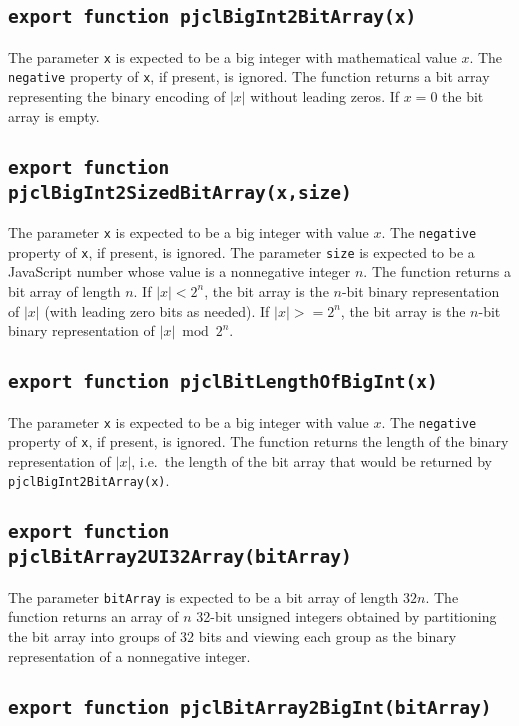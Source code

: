 \documentclass[12pt]{article}
\begin{document}
\subsection{\tt export function pjclBigInt2BitArray(x)}

The parameter {\tt x} is expected to be a big integer with mathematical value $x$.
The {\tt negative} property of {\tt x}, if present, is ignored.
The function returns a bit array representing the binary encoding of
$|x|$ without leading zeros.
If $x = 0$ the bit array is empty.

\subsection{\tt export function pjclBigInt2SizedBitArray(x,size)}

The parameter {\tt x} is expected to be a big integer with
value $x$.
The {\tt negative} property of {\tt x}, if present, is ignored.
The parameter {\tt size} is expected to be a JavaScript number whose
value is a nonnegative integer $n$.  The function returns a bit array
of length $n$.  If $|x| < 2^n$, the
bit array is the $n$-bit binary representation of $|x|$ (with leading zero bits as needed).  If $|x| >= 2^n$,
the bit array is the $n$-bit binary representation of $|x| \bmod 2^n$.

\subsection{\tt export function pjclBitLengthOfBigInt(x)}

The parameter {\tt x} is expected to be a big integer with
value $x$.  
The {\tt negative} property of {\tt x}, if present, is ignored.
The function returns the length of the binary
representation of $|x|$, i.e.\ the length of the bit array that would be
returned by {\tt pjclBigInt2BitArray(x)}.

\subsection{\tt export function pjclBitArray2UI32Array(bitArray)}

The parameter {\tt bitArray} is expected to be a bit array of length
$32n$.  The function returns an array of $n$ 32-bit unsigned integers
obtained by partitioning the bit array into groups of 32 bits and
viewing each group as the binary representation of a nonnegative
integer.

\subsection{\tt export function pjclBitArray2BigInt(bitArray)}
\end{document}
